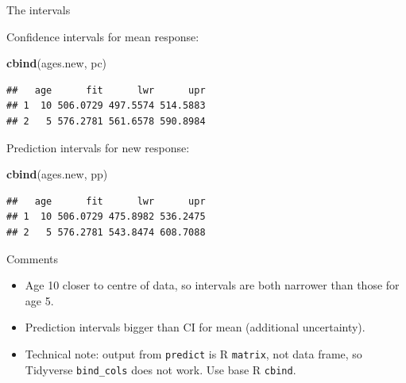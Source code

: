 \documentclass[ignorenonframetext,]{beamer}
\newenvironment{Shaded}{\begin{snugshade}}{\end{snugshade}}
\newcommand{\KeywordTok}[1]{\textcolor[rgb]{0.13,0.29,0.53}{\textbf{#1}}}
\newcommand{\NormalTok}[1]{#1}
\begin{document}
\begin{frame}[fragile]{The intervals}
\protect\hypertarget{the-intervals}{}

Confidence intervals for mean response:

\begin{Shaded}
\begin{Highlighting}[]
\KeywordTok{cbind}\NormalTok{(ages.new, pc)}
\end{Highlighting}
\end{Shaded}

\begin{verbatim}
##   age      fit      lwr      upr
## 1  10 506.0729 497.5574 514.5883
## 2   5 576.2781 561.6578 590.8984
\end{verbatim}

Prediction intervals for new response:

\begin{Shaded}
\begin{Highlighting}[]
\KeywordTok{cbind}\NormalTok{(ages.new, pp)}
\end{Highlighting}
\end{Shaded}

\begin{verbatim}
##   age      fit      lwr      upr
## 1  10 506.0729 475.8982 536.2475
## 2   5 576.2781 543.8474 608.7088
\end{verbatim}

\end{frame}

\begin{frame}[fragile]{Comments}
\protect\hypertarget{comments}{}

\begin{itemize}
\item
  Age 10 closer to centre of data, so intervals are both narrower than
  those for age 5.
\item
  Prediction intervals bigger than CI for mean (additional uncertainty).
\item
  Technical note: output from \texttt{predict} is R \texttt{matrix}, not
  data frame, so Tidyverse \texttt{bind\_cols} does not work. Use base R
  \texttt{cbind}.
\end{itemize}

\end{frame}
\end{document}

